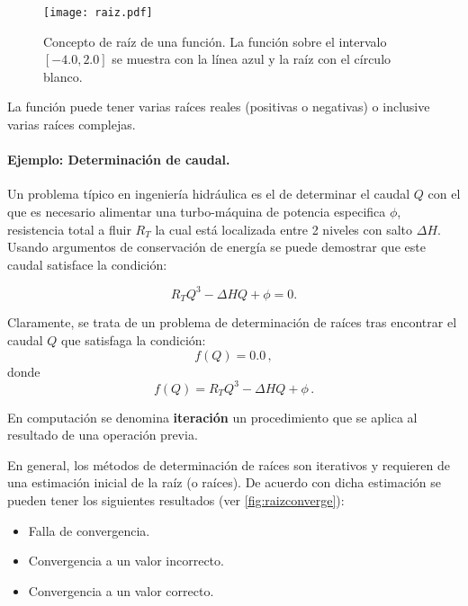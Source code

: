 \begin{figure}[H]
	\centering
	\texttt{[image: raiz.pdf]}
	\caption{Concepto de raíz de una función. La función sobre el intervalo
	$[-4.0, 2.0]$ se muestra con la línea azul y la raíz con el círculo blanco.}
	\label{fig:raiz}
\end{figure}


La función puede tener varias raíces reales (positivas o negativas) o inclusive
varias raíces complejas.

\paragraph{Ejemplo: Determinación de caudal.}
Un problema típico en ingeniería hidráulica es el de determinar el caudal $Q$ 
con el que es necesario alimentar una turbo-máquina de potencia especifica
$\phi$, resistencia total a fluir $R_T$ la cual está localizada entre 2 niveles 
con salto $\Delta H$. Usando argumentos de conservación de energía se puede 
demostrar que este caudal satisface la condición:

\begin{equation}
	{R_T}{Q^3} - \Delta HQ + \phi  = 0.
\label{caudal}
\end{equation}

Claramente, se trata de un problema de determinación de raíces tras encontrar 
el caudal $Q$ que satisfaga la condición:
\[f(Q) = 0.0\, ,\]
donde
\begin{equation}
f(Q) ={R_T}{Q^3} - \Delta HQ + \phi\, .
\label{caudalF}
\end{equation}

\begin{tcolorbox}
En computación se denomina \textbf{iteración} un procedimiento que se aplica al 
resultado de una operación previa.
\end{tcolorbox}

En general, los métodos de determinación de raíces son iterativos y requieren 
de una estimación inicial de la raíz (o raíces). De acuerdo con dicha 
estimación se pueden tener los siguientes resultados (ver 
\cref{fig:raizconverge}):
\begin{itemize}
	\item Falla de convergencia.
	\item Convergencia a un valor incorrecto.
	\item Convergencia a un valor correcto.
\end{itemize}


